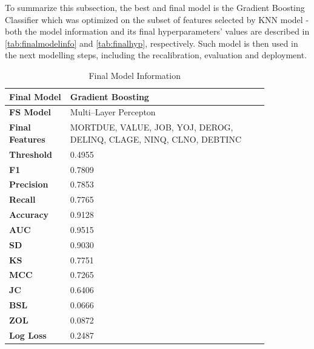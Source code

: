 To summarize this subsection, the best and final model is the Gradient Boosting Classifier which was optimized on the subset of features selected by KNN model - both the model information and its final hyperparameters' values are described in \autoref{tab:finalmodelinfo} and \autoref{tab:finalhyp}, respectively. Such model is then used in the next modelling steps, including the recalibration, evaluation and deployment.
\begin{table}[H]
    \small
    \setlength{\tabcolsep}{8pt}
    \renewcommand{\arraystretch}{1.3}
    \centering
    \caption{Final Model Information}\label{tab:finalmodelinfo}
    \begin{tabular}{p{0.20\linewidth}|p{0.65\linewidth}}
    \toprule
    \midrule
    \textbf{Final Model} & Gradient Boosting \\
    \midrule
    \textbf{FS Model} & Multi--Layer Percepton \\
    \midrule
    \textbf{Final Features} &
    MORTDUE, VALUE, JOB, YOJ, DEROG, DELINQ, CLAGE, NINQ, CLNO, DEBTINC \\
    \midrule
    \textbf{Threshold} & 0.4955 \\
    \midrule
    \textbf{F1} & 0.7809 \\
    \midrule
    \textbf{Precision} & 0.7853 \\
    \midrule
    \textbf{Recall} &  0.7765 \\
    \midrule
    \textbf{Accuracy} & 0.9128 \\
    \midrule
    \textbf{AUC} & 0.9515 \\
    \midrule
    \textbf{SD} & 0.9030 \\
    \midrule
    \textbf{KS} & 0.7751 \\
    \midrule
    \textbf{MCC} & 0.7265 \\
    \midrule
    \textbf{JC} & 0.6406 \\
    \midrule
    \textbf{BSL} & 0.0666 \\
    \midrule
    \textbf{ZOL} & 0.0872 \\
    \midrule
    \textbf{Log Loss} & 0.2487 \\
    \midrule
    \bottomrule
    \end{tabular}
    \vspace{0.5em}

    \vspace{-0.5em}
    \end{table}


